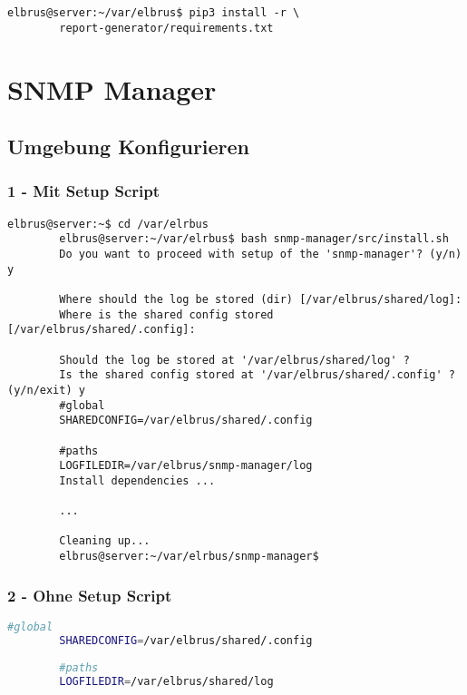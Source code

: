 \documentclass{article}
\begin{document}
	\begin{lstlisting}[caption={Installieren von fehlenden python3 Packages.}]
		elbrus@server:~/var/elbrus$ pip3 install -r \
		report-generator/requirements.txt
	\end{lstlisting}
	\newpage
	
	\section{SNMP Manager}
	\lstset{style=commands}

	\subsection[file config]{Umgebung Konfigurieren}
	\subsubsection{1 - Mit Setup Script}
	\lstset{style=commands}
	\begin{lstlisting}[caption={Ausführen des 'install.sh' Scripts.}]
		elbrus@server:~$ cd /var/elrbus
		elbrus@server:~/var/elrbus$ bash snmp-manager/src/install.sh
		Do you want to proceed with setup of the 'snmp-manager'? (y/n) y
		
		Where should the log be stored (dir) [/var/elbrus/shared/log]:
		Where is the shared config stored [/var/elbrus/shared/.config]:
		
		Should the log be stored at '/var/elbrus/shared/log' ?
		Is the shared config stored at '/var/elbrus/shared/.config' ? (y/n/exit) y
		#global
		SHAREDCONFIG=/var/elbrus/shared/.config
		
		#paths
		LOGFILEDIR=/var/elbrus/snmp-manager/log
		Install dependencies ...
		
		...
		
		Cleaning up...
		elbrus@server:~/var/elrbus/snmp-manager$
	\end{lstlisting}
	
	\subsubsection{2 - Ohne Setup Script}
	\lstset{style=files}
	\begin{lstlisting}[caption={Anhand von '.env.example' eigene '.env' Datei anlegen.}, language=bash, keywords={CONFIGPATH, MAINPATH}, keywordstyle=\color{red}, firstnumber=17]
		#global
		SHAREDCONFIG=/var/elbrus/shared/.config
		
		#paths
		LOGFILEDIR=/var/elbrus/shared/log
	\end{lstlisting}
	
\end{document}
